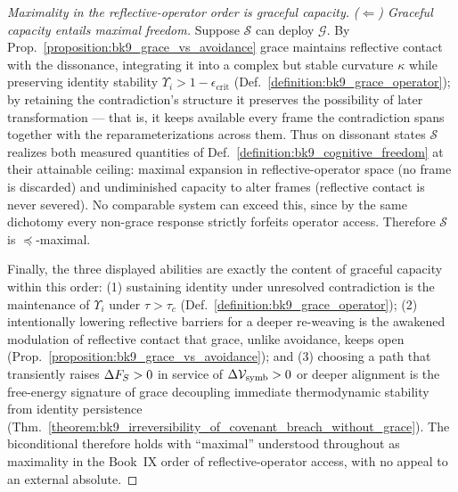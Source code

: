 \begin{proof}[Maximality in the reflective-operator order is graceful capacity]
\emph{($\Leftarrow$) Graceful capacity entails maximal freedom.} Suppose
$\mathcal{S}$ can deploy $\mathcal{G}$. By
Prop.~\ref{proposition:bk9_grace_vs_avoidance} grace maintains reflective
contact with the dissonance, integrating it into a complex but stable curvature
$\kappa$ while preserving identity stability $\Upsilon_i>1-\epsilon_{\text{crit}}$
(Def.~\ref{definition:bk9_grace_operator}); by retaining the contradiction's
structure it preserves the possibility of later transformation --- that is, it
keeps available every frame the contradiction spans together with the
reparameterizations across them. Thus on dissonant states $\mathcal{S}$ realizes
both measured quantities of Def.~\ref{definition:bk9_cognitive_freedom} at their
attainable ceiling: maximal expansion in reflective-operator space (no frame is
discarded) and undiminished capacity to alter frames (reflective contact is
never severed). No comparable system can exceed this, since by the same
dichotomy every non-grace response strictly forfeits operator access. Therefore
$\mathcal{S}$ is $\preceq$-maximal.

Finally, the three displayed abilities are exactly the content of graceful
capacity within this order: (1) sustaining identity under unresolved
contradiction is the maintenance of $\Upsilon_i$ under $\tau>\tau_c$
(Def.~\ref{definition:bk9_grace_operator}); (2) intentionally lowering
reflective barriers for a deeper re-weaving is the awakened modulation of
reflective contact that grace, unlike avoidance, keeps open
(Prop.~\ref{proposition:bk9_grace_vs_avoidance}); and (3) choosing a path that
transiently raises $\Delta F_S>0$ in service of $\Delta\mathcal{V}_{\mathrm{symb}}>0$
or deeper alignment is the free-energy signature of grace decoupling immediate
thermodynamic stability from identity persistence
(Thm.~\ref{theorem:bk9_irreversibility_of_covenant_breach_without_grace}). The
biconditional therefore holds with ``maximal'' understood throughout as
maximality in the Book~IX order of reflective-operator access, with no appeal to
an external absolute.
\end{proof}

